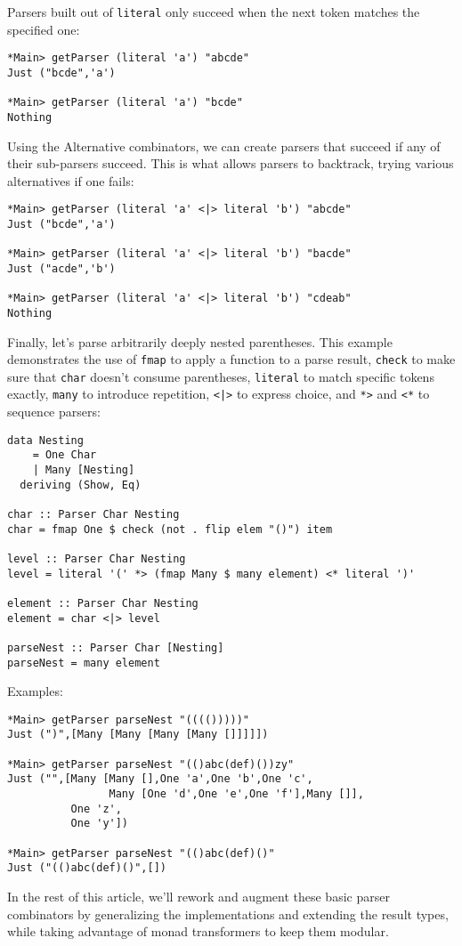 \documentclass{tmr}
\begin{document}
Parsers built out of \verb+literal+ only succeed when the next token matches 
the specified one:
\begin{verbatim}
*Main> getParser (literal 'a') "abcde"
Just ("bcde",'a')

*Main> getParser (literal 'a') "bcde"
Nothing
\end{verbatim}

Using the Alternative combinators, we can create parsers that succeed if any of
their sub-parsers succeed.  This is what allows parsers to backtrack, trying
various alternatives if one fails:
\begin{verbatim}
*Main> getParser (literal 'a' <|> literal 'b') "abcde"
Just ("bcde",'a')

*Main> getParser (literal 'a' <|> literal 'b') "bacde"
Just ("acde",'b')

*Main> getParser (literal 'a' <|> literal 'b') "cdeab"
Nothing
\end{verbatim}
Finally, let's parse arbitrarily deeply nested parentheses.  This example 
demonstrates the use of \verb+fmap+ to apply a function to a parse result, 
\verb+check+ to make sure that \verb+char+ doesn't consume parentheses,
\verb+literal+ to match specific tokens exactly, \verb+many+ to introduce
repetition, \verb+<|>+ to express choice, and \verb+*>+ 
and \verb+<*+ to sequence parsers:
\begin{verbatim}
data Nesting
    = One Char
    | Many [Nesting]
  deriving (Show, Eq)
  
char :: Parser Char Nesting
char = fmap One $ check (not . flip elem "()") item

level :: Parser Char Nesting
level = literal '(' *> (fmap Many $ many element) <* literal ')'

element :: Parser Char Nesting
element = char <|> level

parseNest :: Parser Char [Nesting]
parseNest = many element
\end{verbatim}
Examples:
\begin{verbatim}
*Main> getParser parseNest "(((()))))"
Just (")",[Many [Many [Many [Many []]]]])

*Main> getParser parseNest "(()abc(def)())zy"
Just ("",[Many [Many [],One 'a',One 'b',One 'c',
                Many [One 'd',One 'e',One 'f'],Many []],
          One 'z',
          One 'y'])

*Main> getParser parseNest "(()abc(def)()"
Just ("(()abc(def)()",[])
\end{verbatim}
In the rest of this article, we'll rework and augment these basic parser 
combinators by generalizing the implementations and extending the result types,
while taking advantage of monad transformers to keep them modular.
\end{document}
